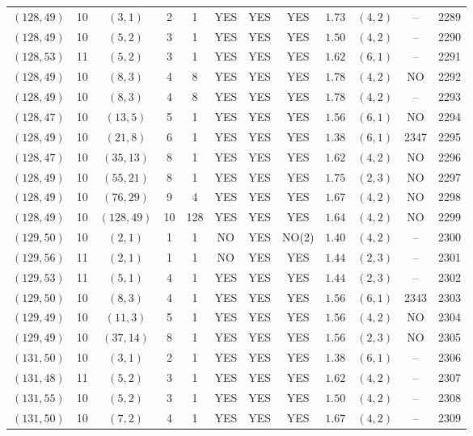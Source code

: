 \begin{longtable}{|c|c|c|c|c|c|c|c|c|c|c|c|}
$(128,49)$ & 10 & $(3,1)$ & 2 & 1 & YES & YES & YES & $1.73$ & $(4,2)$ & -- & 2289\\
$(128,49)$ & 10 & $(5,2)$ & 3 & 1 & YES & YES & YES & $1.50$ & $(4,2)$ & -- & 2290\\
$(128,53)$ & 11 & $(5,2)$ & 3 & 1 & YES & YES & YES & $1.62$ & $(6,1)$ & -- & 2291\\
$(128,49)$ & 10 & $(8,3)$ & 4 & 8 & YES & YES & YES & $1.78$ & $(4,2)$ & NO & 2292\\
$(128,49)$ & 10 & $(8,3)$ & 4 & 8 & YES & YES & YES & $1.78$ & $(4,2)$ & -- & 2293\\
$(128,47)$ & 10 & $(13,5)$ & 5 & 1 & YES & YES & YES & $1.56$ & $(6,1)$ & NO & 2294\\
$(128,49)$ & 10 & $(21,8)$ & 6 & 1 & YES & YES & YES & $1.38$ & $(6,1)$ & 2347 & 2295\\
$(128,47)$ & 10 & $(35,13)$ & 8 & 1 & YES & YES & YES & $1.62$ & $(4,2)$ & NO & 2296\\
$(128,49)$ & 10 & $(55,21)$ & 8 & 1 & YES & YES & YES & $1.75$ & $(2,3)$ & NO & 2297\\
$(128,49)$ & 10 & $(76,29)$ & 9 & 4 & YES & YES & YES & $1.67$ & $(4,2)$ & NO & 2298\\
$(128,49)$ & 10 & $(128,49)$ & 10 & 128 & YES & YES & YES & $1.64$ & $(4,2)$ & NO & 2299\\
$(129,50)$ & 10 & $(2,1)$ & 1 & 1 & NO & YES & NO(2) & $1.40$ & $(4,2)$ & -- & 2300\\
$(129,56)$ & 11 & $(2,1)$ & 1 & 1 & NO & YES & YES & $1.44$ & $(2,3)$ & -- & 2301\\
$(129,53)$ & 11 & $(5,1)$ & 4 & 1 & YES & YES & YES & $1.44$ & $(2,3)$ & -- & 2302\\
$(129,50)$ & 10 & $(8,3)$ & 4 & 1 & YES & YES & YES & $1.56$ & $(6,1)$ & 2343 & 2303\\
$(129,49)$ & 10 & $(11,3)$ & 5 & 1 & YES & YES & YES & $1.56$ & $(4,2)$ & NO & 2304\\
$(129,49)$ & 10 & $(37,14)$ & 8 & 1 & YES & YES & YES & $1.56$ & $(2,3)$ & NO & 2305\\
$(131,50)$ & 10 & $(3,1)$ & 2 & 1 & YES & YES & YES & $1.38$ & $(6,1)$ & -- & 2306\\
$(131,48)$ & 11 & $(5,2)$ & 3 & 1 & YES & YES & YES & $1.62$ & $(4,2)$ & -- & 2307\\
$(131,55)$ & 10 & $(5,2)$ & 3 & 1 & YES & YES & YES & $1.50$ & $(4,2)$ & -- & 2308\\
$(131,50)$ & 10 & $(7,2)$ & 4 & 1 & YES & YES & YES & $1.67$ & $(4,2)$ & -- & 2309\\

\end{longtable}
